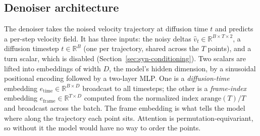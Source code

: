 \subsection{Denoiser architecture}
\label{sec:syn-model}

The denoiser takes the noised velocity trajectory at diffusion time $t$ and
predicts a per-step velocity field. It has three inputs: the noisy deltas
$\hat v_t\in\mathbb{R}^{B\times T\times 2}$, a diffusion timestep
$t\in\mathbb{R}^B$ (one per trajectory, shared across the $T$ points), and a turn
scalar, which is disabled (Section~\ref{sec:syn-conditioning}). Two scalars are
lifted into embeddings of width $D$, the model's hidden dimension, by a
sinusoidal positional encoding followed by a two-layer MLP. One is a
\emph{diffusion-time} embedding $e_{\text{time}}\in\mathbb{R}^{B\times D}$
broadcast to all timesteps; the other is a \emph{frame-index} embedding
$e_{\text{frame}}\in\mathbb{R}^{T\times D}$ computed from the normalized index
$\text{arange}(T)/T$ and broadcast across the batch. The frame embedding is what
tells the model where along the trajectory each point sits. Attention is
permutation-equivariant, so without it the model would have no way to order the
points.

